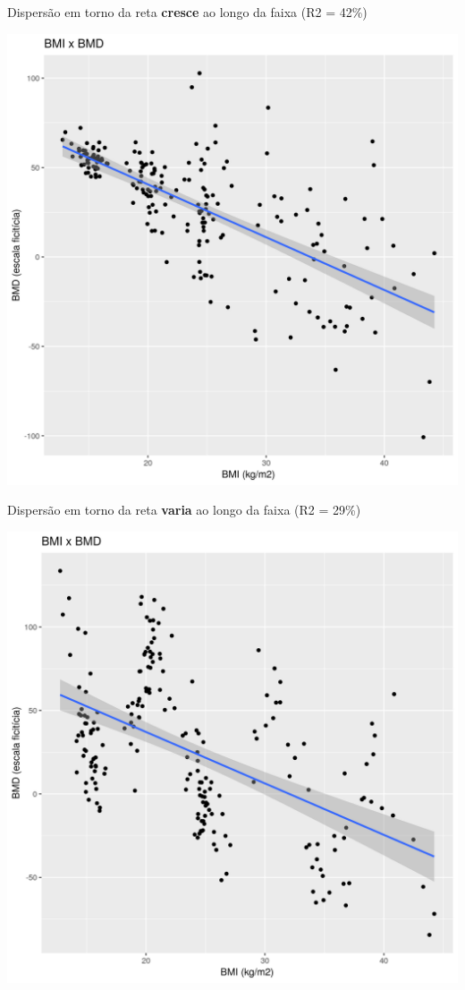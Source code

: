 \documentclass{beamer}
\begin{document}
\begin{frame}{\small Dispersão em torno da reta {\bf cresce} ao longo da faixa (R2 = 42\%)}
  \begin{center}
    \includegraphics[height=.9\textheight]{Cap18-19/pratica-plot-heterocedasticidade}
  \end{center}
\end{frame}

\begin{frame}{\small Dispersão em torno da reta {\bf varia} ao longo da faixa (R2 = 29\%)}
  \begin{center}
    \includegraphics[height=.9\textheight]{Cap18-19/pratica-plot-heterocedasticidade-sin}
  \end{center}
\end{frame}
\end{document}
